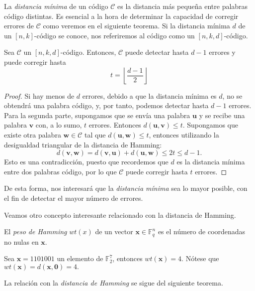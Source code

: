 La \emph{distancia mínima} de un código $\mathcal{C}$ es la distancia más pequeña entre palabras código distintas. Es esencial a la hora de determinar la capacidad de corregir errores de $\mathcal{C}$ como veremos en el siguiente teorema. Si la distancia mínima $d$ de un $[n,k]$-código se conoce, nos referiremos al código como un $[n,k,d]$-código.

\begin{teorema}\label{th:errores} Sea $\mathcal{C}$ un $[n,k,d]$-código. Entonces, $\mathcal{C}$ puede detectar hasta $d-1$ errores y puede corregir hasta $$ t = \left\lfloor \frac{d-1}{2} \right\rfloor $$

\end{teorema}

\begin{proof}
  Si hay menos de $d$ errores, debido a que la distancia mínima es $d$, no se obtendrá una palabra código, y, por tanto, podemos detectar hasta $d-1$ errores.
  Para la segunda parte, supongamos que se envía una palabra $\mathbf{u}$ y se recibe una palabra $\mathbf{v}$ con, a lo sumo, $t$ errores. Entonces $d(\mathbf{u,v}) \leq t$. Supongamos que existe otra palabra $\mathbf{w} \in \mathcal{C}$ tal que $d(\mathbf{u,w}) \leq t$, entonces utilizando la desigualdad triangular de la distancia de Hamming:
  $$d(\mathbf{v,w}) = d(\mathbf{v,u}) + d(\mathbf{u,w})  \leq 2t \leq d-1.$$
  Esto es una contradicción, puesto que recordemos que $d$ es la distancia mínima entre dos palabras código, por lo que $\mathcal{C}$ puede corregir hasta $t$ errores.
\end{proof}

De esta forma, nos interesará que la \emph{distancia mínima} sea lo mayor posible, con el fin de detectar el mayor número de errores.

Veamos otro concepto interesante relacionado con la distancia de Hamming.

\begin{definicion}
El \emph{peso de Hamming} $wt(x)$ de un vector $\mathbf{x} \in \mathds{F}_{q}^n$ es el número de coordenadas no nulas en $\mathbf{x}$.
\end{definicion}

\begin{ejemplo}
Sea $\mathbf{x} = 1101001$ un elemento de $\mathds{F}_{2}^7$, entonces $wt(\mathbf{x}) = 4$. Nótese que $wt(\mathbf{x}) = d(\mathbf{x,0}) = 4.$
\end{ejemplo}

La relación con la \emph{distancia de Hamming} se sigue del siguiente teorema.

